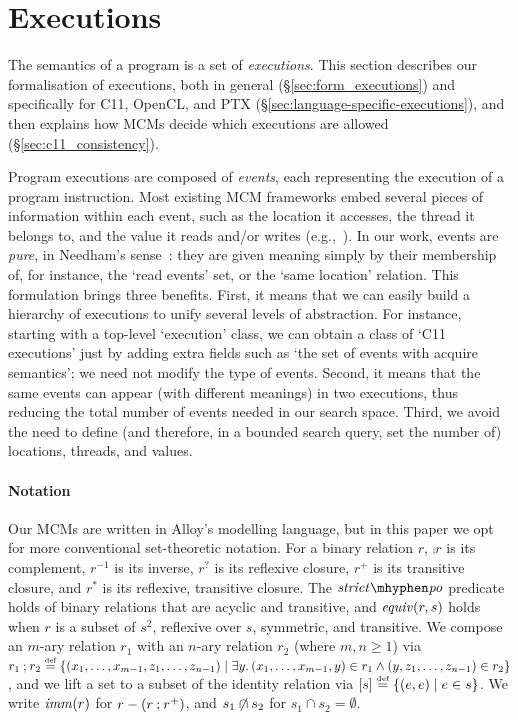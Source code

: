 \section{Executions}
\label{sec:executions}

The semantics of a program is a set of \emph{executions}. This section
describes our formalisation of executions, both in general
(\S\ref{sec:form_executions}) and specifically for C11, OpenCL, and
PTX (\S\ref{sec:language-specific-executions}), and then
explains how MCMs decide which executions are allowed
(\S\ref{sec:c11_consistency}).

Program executions are composed of \emph{events}, each representing
the execution of a program instruction. Most existing MCM frameworks
embed several pieces of information within each event, such as the
location it accesses, the thread it belongs to, and the value it reads
and/or writes (e.g.,~\cite{adve+90, alglave+10, batty+11, morisset+13,
sarkar+09}). In our work, events are \emph{pure}, in Needham's
sense~\cite{needham89}: they are given meaning simply by their
membership of, for instance, the `read events' set, or the `same
location' relation. This formulation brings three benefits. First, it
means that we can easily build a hierarchy of executions to unify
several levels of abstraction. For instance, starting with a top-level
`execution' class, we can obtain a class of `C11 executions' just by
adding extra fields such as `the set of events with acquire
semantics'; we need not modify the type of events. Second, it means
that the same events can appear (with different meanings) in two
executions, thus reducing the total number of events needed in our
search space. Third, we avoid the need to define (and therefore, in a
bounded search query, set the number of) locations, threads, and
values.

\paragraph{Notation} Our MCMs are written in Alloy's modelling
language, but in this paper we opt for more conventional set-theoretic
notation. For a binary relation $r$, $\comp{r}$ is its complement,
$r^{-1}$ is its inverse, $r^?$ is its reflexive closure, $r^+$ is its
transitive closure, and $r^*$ is its reflexive, transitive
closure. The $\spo$ predicate holds of binary relations that are
acyclic and transitive, and $\mathit{equiv}(r,s)$ holds when $r$ is a
subset of $s^2$, reflexive over $s$, symmetric, and transitive. We
compose an $m$-ary relation $r_1$ with an $n$-ary relation
$r_2$ (where $m,n\ge 1$) via
$r_1\join r_2 \eqdef \{(x_1,\dots, x_{m-1},z_1,\dots, z_{n-1})\mid \exists
y\ldotp (x_1,\dots, x_{m-1}, y)\in r_1 \wedge (y,z_1,\dots, z_{n-1})\in
r_2\}$,
and we lift a set to a subset of the identity relation via
$\stor{s} \eqdef \{(e,e)\mid e\in s\}$. We write $\mathit{imm}(r)$ for
$r-(r\mathbin{;} r^+)$, and $s_1\mathbin{\not\hspace{-0.25em}\cap} s_2$ for $s_1\cap s_2 = \emptyset$.

